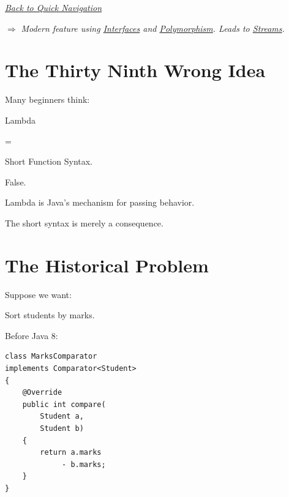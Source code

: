 \documentclass[11pt,a4paper]{book}
\begin{document}
\smallskip
\noindent
\hyperref[sec:quick_nav]{\emph{Back to Quick Navigation}}

\smallskip
\noindent
\textcolor{RosettaRoyalPurple}{$\Rightarrow$}
\emph{Modern feature using \hyperref[chap:interfaces]{Interfaces} and \hyperref[chap:polymorphism]{Polymorphism}. Leads to \hyperref[chap:streams]{Streams}.}


\section{The Thirty Ninth Wrong Idea}

\begin{trap}

Many beginners think:


Lambda

=

Short Function Syntax.


False.


Lambda is Java's mechanism
for passing behavior.


The short syntax is merely
a consequence.

\end{trap}


\section{The Historical Problem}

Suppose we want:


Sort students by marks.


Before Java 8:

\begin{verbatim} 
class MarksComparator
implements Comparator<Student>
{
    @Override
    public int compare(
        Student a,
        Student b)
    {
        return a.marks
             - b.marks;
    }
}
\end{verbatim}
\end{document}
